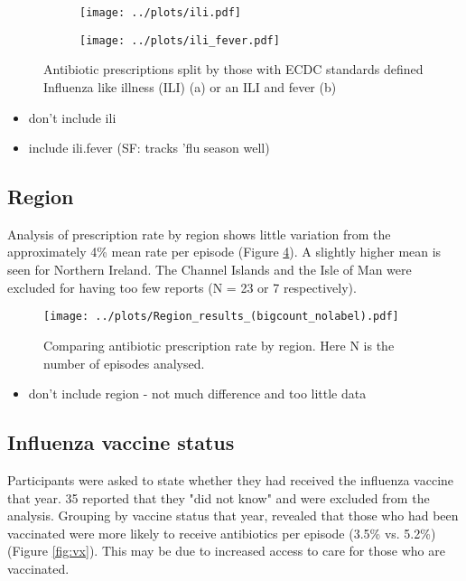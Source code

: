 \documentclass{article}
\begin{document}
\begin{figure}[htbp]
    \centering
    \begin{subfigure}[b]{0.4\textwidth}
   		\texttt{[image: ../plots/ili.pdf]}
   		\caption{}
   		\label{fig:ili}
    \end{subfigure}
    \begin{subfigure}[b]{0.4\textwidth}
        \texttt{[image: ../plots/ili\_fever.pdf]}
		\caption{}
		\label{fig:ili.fever}
    \end{subfigure}
    \caption{Antibiotic prescriptions split by those with ECDC standards defined Influenza like illness (ILI) (a) or an ILI and fever (b)}
    \label{fig:ilif}
\end{figure}

\begin{itemize}
	\item don't include ili
	\item include ili.fever (SF: tracks 'flu season well)
\end{itemize}

\subsection{Region}

Analysis of prescription rate by region shows little variation from the approximately 4\% mean rate per episode (Figure \ref{fig:region}). A slightly higher mean is seen for Northern Ireland. The Channel Islands and the Isle of Man were excluded for having too few reports (N = 23 or 7 respectively). 

	\begin{figure}[htbp]
		\centering
		\texttt{[image: ../plots/Region\_results\_(bigcount\_nolabel).pdf]}
		\caption{Comparing antibiotic prescription rate by region. Here N is the number of episodes analysed.}
		\label{fig:region}
	\end{figure} 

\begin{itemize}
	\item don't include region - not much difference and too little data
\end{itemize}

\subsection{Influenza vaccine status}

Participants were asked to state whether they had received the influenza vaccine that year. 35 reported that they "did not know" and were excluded from the analysis. Grouping by vaccine status that year, revealed that those who had been vaccinated were more likely to receive antibiotics per episode (3.5\% vs. 5.2\%) (Figure \ref{fig:vx}). This may be due to increased access to care for those who are vaccinated. 
\end{document}
